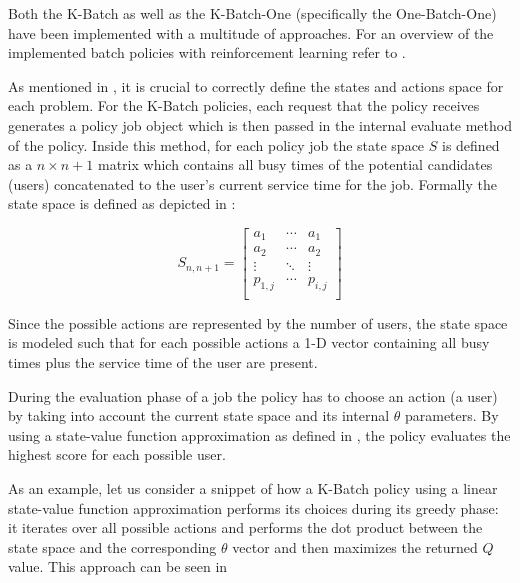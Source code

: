 \documentclass{seal_thesis}
\begin{document}
Both the K-Batch as well as the K-Batch-One (specifically the One-Batch-One) have been implemented with a multitude of approaches. For an overview of the implemented batch policies with reinforcement learning refer to .


As mentioned in , it is crucial to correctly define the states and actions space for each problem. For the K-Batch policies, each request that the policy receives generates a policy job object which is then passed in the internal evaluate method of the policy. Inside this method, for each policy job the state space $S$ is defined as a $n \times n+1$ matrix which contains all busy times of the potential candidates (\ie users) concatenated to the user's current service time for the job. Formally the state space is defined as depicted in :

\begin{equation}
\label{eq:kbatch_sp}
	S_{n,n+1} = 
	\begin{bmatrix}
	a_1 & \cdots & a_1 \\
	a_2 & \cdots & a_2 \\
	\vdots & \ddots & \vdots \\
	p_{1,j} & \cdots & p_{i,j} \\
	\end{bmatrix}
\end{equation}

Since the possible actions are represented by the number of users, the state space is modeled such that for each possible actions a 1-D vector containing all busy times plus the service time of the user are present.

During the evaluation phase of a job the policy has to choose an action (\ie a user) by taking into account the current state space and its internal $\theta$ parameters. By using a state-value function approximation as defined in , the policy evaluates the highest score for each possible user.

As an example, let us consider a snippet of how a K-Batch policy using a linear state-value function approximation performs its choices during its greedy phase: it iterates over all possible actions and performs the dot product between the state space and the corresponding $\theta$ vector and then maximizes the returned $Q$ value. This approach can be seen in  
\end{document}
